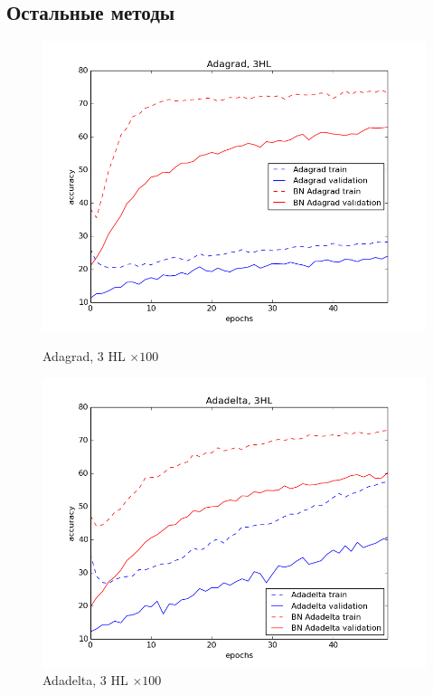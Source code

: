 \documentclass[12pt,oneside]{article}
\begin{document}
\newpage

\subsection{Остальные методы}

\begin{figure}[h!]
\centering
\begin{minipage}{0.45\textwidth}
\includegraphics[scale=0.38]{images/clAdagrad.png}
\caption{\small Adagrad, $3$ HL $\times 100$}
\end{minipage} \hfill
\begin{minipage}{0.45\textwidth}
\includegraphics[scale=0.38]{images/clAdadelta.png}
\caption{\small Adadelta, $3$ HL $\times 100$}

\end{minipage}
\end{figure}
\end{document}
